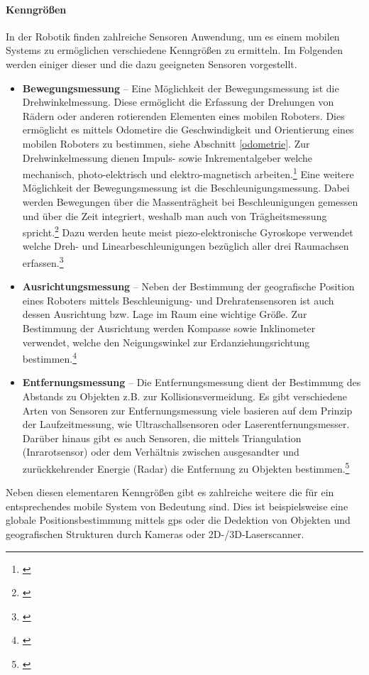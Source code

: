 \paragraph{Kenngrößen}
In der Robotik finden zahlreiche Sensoren Anwendung, um es einem mobilen Systems zu ermöglichen verschiedene Kenngrößen zu ermitteln. Im Folgenden werden einiger dieser und die dazu geeigneten Sensoren vorgestellt.
\begin{itemize}
	\item{\textbf{Bewegungsmessung}} -- Eine Möglichkeit der Bewegungsmessung ist die Drehwinkelmessung. Diese ermöglicht die Erfassung der Drehungen von Rädern oder anderen rotierenden Elementen eines mobilen Roboters. Dies ermöglicht es mittels Odometire die Geschwindigkeit und Orientierung eines mobilen Roboters zu bestimmen, siehe Abschnitt \eqref{odometrie}. Zur Drehwinkelmessung dienen Impuls- sowie Inkrementalgeber welche mechanisch, photo-elektrisch und elektro-magnetisch arbeiten.\footnote{\citep[vgl.][Mobile Roboter, Seite 28 ff.]{Hertzberg.MobileRoboter}\label{note10}}
	\newline
	Eine weitere Möglichkeit der Bewegungsmessung ist die Beschleunigungsmessung. Dabei werden Bewegungen über die Massenträgheit bei Beschleunigungen gemessen und über die Zeit integriert, weshalb man auch von Trägheitsmessung spricht.\footnote{\citep[vgl.][Mobile Roboter, Seite 31]{Hertzberg.MobileRoboter}\label{note11}} Dazu werden heute meist
	piezo-elektronische Gyroskope verwendet welche Dreh- und Linearbeschleunigungen bezüglich aller drei Raumachsen erfassen.\footnote{\citep[vgl.][Mobile Roboter, Seite 32 ff.]{Hertzberg.MobileRoboter}\label{note11}}
	\item{\textbf{Ausrichtungsmessung}} -- Neben der Bestimmung der geografische Position eines Roboters mittels Beschleunigung- und Drehratensensoren ist auch dessen Ausrichtung bzw. Lage im Raum eine wichtige Größe. Zur Bestimmung der Ausrichtung werden Kompasse sowie Inklinometer verwendet, welche den Neigungswinkel zur Erdanziehungsrichtung bestimmen.\footnote{\citep[vgl.][Mobile Roboter, Seite 32 f.]{Hertzberg.MobileRoboter}\label{note12}}
	\item{\textbf{Entfernungsmessung}} -- Die Entfernungsmessung dient der Bestimmung des Abstands zu Objekten z.B. zur Kollisionsvermeidung. 
	\newline
	Es gibt verschiedene Arten von Sensoren zur Entfernungsmessung viele basieren auf dem Prinzip der Laufzeitmessung, wie Ultraschallsensoren oder Laserentfernungsmesser. Darüber hinaus gibt es auch Sensoren, die mittels Triangulation (Inrarotsensor) oder dem Verhältnis zwischen ausgesandter und zurückkehrender Energie (Radar) die Entfernung zu Objekten bestimmen.\footnote{\citep[vgl.][Mobile Roboter, Seite 36 f.]{Hertzberg.MobileRoboter}\label{note13}}
\end{itemize}
Neben diesen elementaren Kenngrößen gibt es zahlreiche weitere die für ein entsprechendes mobile System von Bedeutung sind. Dies ist beispielsweise eine globale Positionsbestimmung mittels \gls{gps} oder die Dedektion von Objekten und geografischen Strukturen durch Kameras oder 2D-/3D-Laserscanner.
